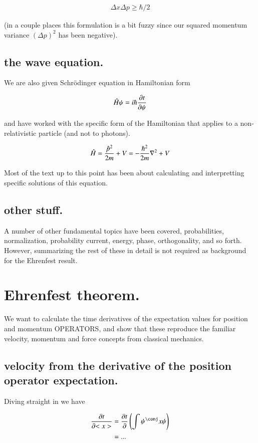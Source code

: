 \documentclass{article}
\begin{document}
\begin{align*}
\Delta x \Delta p \ge \hbar/2
\end{align*}

(in a couple places this formulation is a bit fuzzy since our squared
momentum variance $(\Delta p)^2$ has been negative).

\subsection{ the wave equation. }

We are also given Schr\"{o}dinger equation in Hamiltonian form

\begin{align*}
\hat{H} \psi = i \hbar \frac{\partial{t}}{\partial {\psi}}
\end{align*}

and have worked with the specific form of the Hamiltonian that applies to
a non-relativistic particle (and not to photons).

\begin{align*}
\hat{H} = \frac{\hat{p}^2}{2m} + V = -\frac{\hbar^2}{2m} \nabla^2 + V
\end{align*}

Most of the text up to this point has been about calculating and interpretting
specific solutions of this equation.

\subsection{ other stuff. }

A number of other fundamental topics have been covered, probabilities, normalization, probability current, energy, phase, orthogonality, and so forth.  However, summarizing the rest of these in detail is not required as 
background for the Ehrenfest result.

\section{ Ehrenfest theorem. }

We want to calculate the time derivatives of the expectation values
for position and momentum OPERATORS, and show that these reproduce the
familiar velocity, momentum and force concepts from classical mechanics.

\subsection{ velocity from the derivative of the position operator expectation. }

Diving straight in we have

\begin{align*}
\PD{t}{<x>}
&= \PD{t}{} \left( \int \psi^\conj x \psi \right) \\
&= ...
\end{align*}



\end{document}
